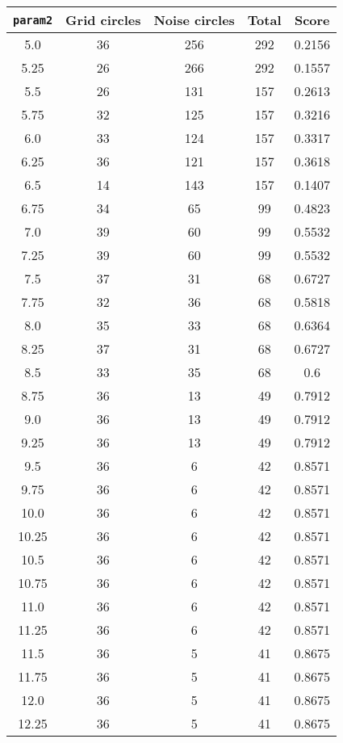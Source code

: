 \documentclass[letterpaper, 12pt]{article}
\begin{document}
\begin{longtable}{|c|c|c|c|c|}
\hline
\textbf{\texttt{param2}} & \textbf{Grid circles} & \textbf{Noise circles} & \textbf{Total} & \textbf{Score} \\
\hline
5.0 & 36 & 256 & 292 & 0.2156 \\
\hline
5.25 & 26 & 266 & 292 & 0.1557 \\
\hline
5.5 & 26 & 131 & 157 & 0.2613 \\
\hline
5.75 & 32 & 125 & 157 & 0.3216 \\
\hline
6.0 & 33 & 124 & 157 & 0.3317 \\
\hline
6.25 & 36 & 121 & 157 & 0.3618 \\
\hline
6.5 & 14 & 143 & 157 & 0.1407 \\
\hline
6.75 & 34 & 65 & 99 & 0.4823 \\
\hline
7.0 & 39 & 60 & 99 & 0.5532 \\
\hline
7.25 & 39 & 60 & 99 & 0.5532 \\
\hline
7.5 & 37 & 31 & 68 & 0.6727 \\
\hline
7.75 & 32 & 36 & 68 & 0.5818 \\
\hline
8.0 & 35 & 33 & 68 & 0.6364 \\
\hline
8.25 & 37 & 31 & 68 & 0.6727 \\
\hline
8.5 & 33 & 35 & 68 & 0.6 \\
\hline
8.75 & 36 & 13 & 49 & 0.7912 \\
\hline
9.0 & 36 & 13 & 49 & 0.7912 \\
\hline
9.25 & 36 & 13 & 49 & 0.7912 \\
\hline
9.5 & 36 & 6 & 42 & 0.8571 \\
\hline
9.75 & 36 & 6 & 42 & 0.8571 \\
\hline
10.0 & 36 & 6 & 42 & 0.8571 \\
\hline
10.25 & 36 & 6 & 42 & 0.8571 \\
\hline
10.5 & 36 & 6 & 42 & 0.8571 \\
\hline
10.75 & 36 & 6 & 42 & 0.8571 \\
\hline
11.0 & 36 & 6 & 42 & 0.8571 \\
\hline
11.25 & 36 & 6 & 42 & 0.8571 \\
\hline
11.5 & 36 & 5 & 41 & 0.8675 \\
\hline
11.75 & 36 & 5 & 41 & 0.8675 \\
\hline
12.0 & 36 & 5 & 41 & 0.8675 \\
\hline
12.25 & 36 & 5 & 41 & 0.8675 \\
\hline

\end{longtable}
\end{document}

